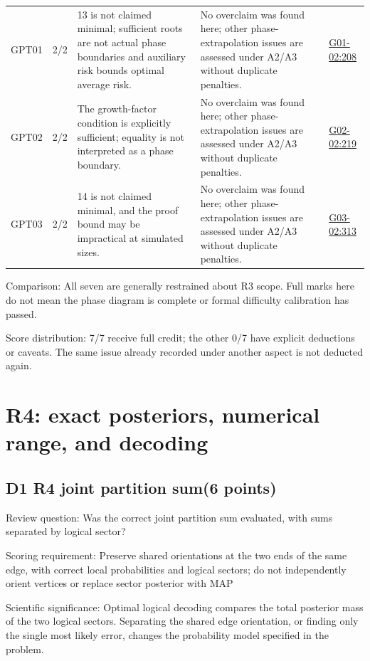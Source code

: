 \documentclass[11pt,a4paper]{article}
\begin{document}
{\begin{longtable}
{}GPT01 & 2/\allowbreak{}2 & 13 is not claimed minimal; sufficient roots are not actual phase boundaries and auxiliary risk bounds optimal average risk. & No overclaim was found here; other phase-extrapolation issues are assessed under A2/\allowbreak{}A3 without duplicate penalties. & \hyperref[src:G01-02]{G01-02:208}\tabularnewline
{}GPT02 & 2/\allowbreak{}2 & The growth-factor condition is explicitly sufficient; equality is not interpreted as a phase boundary. & No overclaim was found here; other phase-extrapolation issues are assessed under A2/\allowbreak{}A3 without duplicate penalties. & \hyperref[src:G02-02]{G02-02:219}\tabularnewline
{}GPT03 & 2/\allowbreak{}2 & 14 is not claimed minimal,\allowbreak{} and the proof bound may be impractical at simulated sizes. & No overclaim was found here; other phase-extrapolation issues are assessed under A2/\allowbreak{}A3 without duplicate penalties. & \hyperref[src:G03-02]{G03-02:313}\tabularnewline
\bottomrule
\end{longtable}
}
Comparison: All seven are generally restrained about R3 scope. Full marks here do not mean the phase diagram is complete or formal difficulty calibration has passed.

Score distribution: 7/\allowbreak{}7 receive full credit; the other 0/\allowbreak{}7 have explicit deductions or caveats. The same issue already recorded under another aspect is not deducted again.

\clearpage
\section{R4: exact posteriors,\allowbreak{} numerical range,\allowbreak{} and decoding}
\subsection{D1 R4 joint partition sum(6 points)}
\label{aspect:D1}
Review question: Was the correct joint partition sum evaluated,\allowbreak{} with sums separated by logical sector?

Scoring requirement: Preserve shared orientations at the two ends of the same edge,\allowbreak{} with correct local probabilities and logical sectors; do not independently orient vertices or replace sector posterior with MAP

Scientific significance: Optimal logical decoding compares the total posterior mass of the two logical sectors. Separating the shared edge orientation,\allowbreak{} or finding only the single most likely error,\allowbreak{} changes the probability model specified in the problem.
\end{document}
